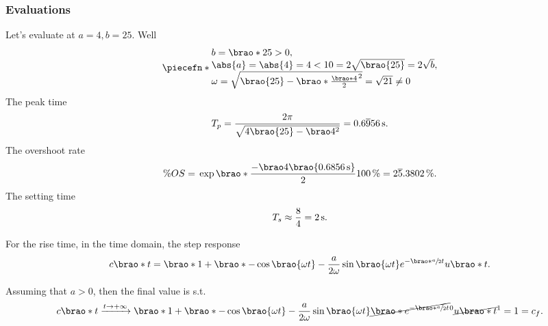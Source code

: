 \documentclass[12pt]{article}
\newcommand*\siexpr[2][]{\SI[parse-numbers=false,#1]{#2}}%
\DeclarePairedDelimiter\brao()%
\DeclarePairedDelimiter\abs||
\DeclarePairedDelimiter\piecefn\{.
\begin{document}
\begin{enumerate}[(a)]
        \subsubsection{Evaluations}
        Let's evaluate at $a = 4, b = 25$. Well
        \begin{equation}
            \piecefn*{
                \begin{array}{@{}l@{}}
                    b = \brao*{25} > 0,
                \\*
                    \abs{a} = \abs{4} = 4 < 10 = 2\sqrt{\brao{25}} = 2\sqrt{b},
                \\*
                    \omega = \sqrt{\brao{25} - \brao*{\frac{\brao*4}2}^2} = \sqrt{21} \not= 0
                \\*
                \end{array}
            }
        \end{equation}
        The peak time
        \begin{equation}
            T_p = \frac{2\pi}{\sqrt{4\brao{25} - \brao4^2}} = \siexpr{0.6\overline956}\second.
        \end{equation}
        The overshoot rate
        \begin{equation}
                \% OS
                ={} \exp\brao*{\frac{-\brao4\brao{\SI{0.6856}\second}}2} \SI{100}\percent = \siexpr{2\overline5.3802}\percent.
        \end{equation}
        The setting time
        \begin{equation}
            T_s \approx \frac84 = \SI2\second.
        \end{equation}

        For the rise time, in the time domain, the step response
        \begin{equation}
            \begin{aligned}
                c\brao*t = \brao*{1 + \brao*{-\cos\brao{\omega t} - \frac{a}{2\omega} \sin\brao{\omega t} }{e^{-\brao*{\sfrac{a}2}t}}}u\brao*t.
            \end{aligned}
        \end{equation}

        Assuming that $a > 0$, then the final value is s.t.
        \begin{equation}
            c\brao*t
            \xrightarrow{t\to+\infty} \brao*{1 + \brao*{-\cos\brao{\omega t} - \frac{a}{2\omega} \sin\brao{\omega t} }\cancel{\brao*{e^{-\brao*{\sfrac{a}2}t}}}^0} \cancel{u\brao*t}^1 = 1 = c_f.
        \end{equation}


\end{enumerate}
\end{document}
